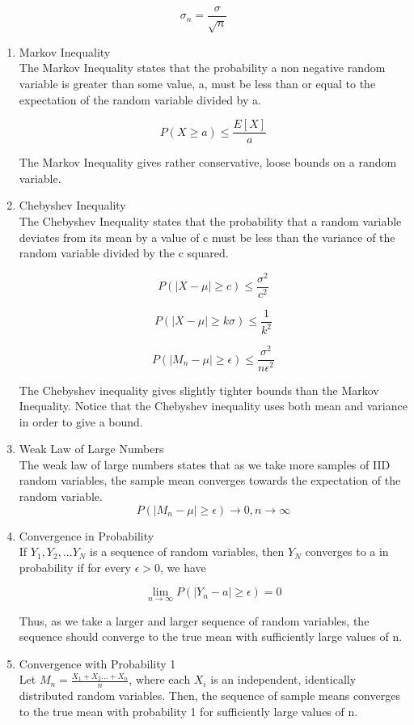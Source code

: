 \documentclass{article}
\begin{document}
$$\sigma_n = \frac{\sigma}{\sqrt{n}}$$

\begin{enumerate}
    \item Markov Inequality \\
    The Markov Inequality states that the probability a non negative random variable is greater than some value, a, must be less than or equal to the expectation of the random variable divided by a.

    $$P(X \geq a) \leq \frac{E[X]}{a}$$

    The Markov Inequality gives rather conservative, loose bounds on a random variable.
    \item Chebyshev Inequality \\
    The Chebyshev Inequality states that the probability that a random variable deviates from its mean by a value of c must be less than the variance of the random variable divided by the c squared. 

    $$P(|X - \mu| \geq c) \leq \frac{\sigma^2}{c^2}$$
    
    $$P(|X - \mu| \geq k\sigma) \leq \frac{1}{k^2}$$

    $$P(|M_n - \mu| \geq \epsilon) \leq \frac{\sigma^2}{n\epsilon^2} $$

    The Chebyshev inequality gives slightly tighter bounds than the Markov Inequality. Notice that the Chebyshev inequality uses both mean and variance in order to give a bound. 
    \item Weak Law of Large Numbers \\
    The weak law of large numbers states that as we take more samples of IID random variables, the sample mean converges towards the expectation of the random variable. 
    $$P(|M_n - \mu| \geq \epsilon) \rightarrow 0, n \rightarrow \infty$$
    \item Convergence in Probability \\
    If $Y_1, Y_2, ... Y_N$ is a sequence of random variables, then $Y_N$ converges to a in probability if for every $\epsilon > 0$, we have
    
    $$\lim_{n\to \infty} P(|Y_n - a| \geq \epsilon) = 0$$

    Thus, as we take a larger and larger sequence of random variables, the sequence should converge to the true mean with sufficiently large values of n. 
    
    \item Convergence with Probability 1 \\
    Let $M_n = \frac{X_1 + X_2 ... + X_n}{n}$, where each $X_i$ is an independent, identically distributed random variables. Then, the sequence of sample means converges to the true mean with probability 1 for sufficiently large values of n.
    

\end{enumerate}
\end{document}
